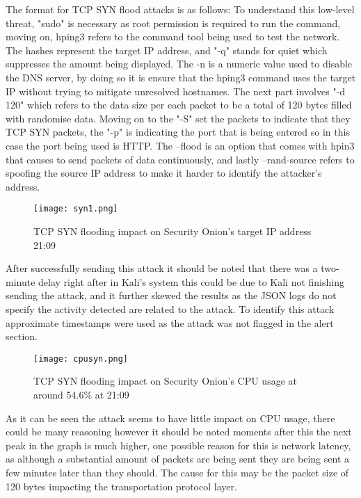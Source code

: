 \documentclass[12pt]{article}
\begin{document}
		The format for TCP SYN flood attacks is as follows:
		To understand this low-level threat, "sudo" is necessary as root permission is required to run the command, moving on, hping3 refers to the command tool being used to test the network. The hashes represent the target IP address, and "-q" stands for quiet which suppresses the amount being displayed. The -n is a numeric value used to disable the DNS server, by doing so it is ensure that the hping3 command uses the target IP without trying to mitigate unresolved hostnames. The next part involves "-d 120" which refers to the data size per each packet to be a total of 120 bytes filled with randomise data. Moving on to the "-S" set the packets to indicate that they 
		TCP SYN packets,  the "-p" is indicating the port that is being entered so in this case the port being used is HTTP. The --flood is an option that comes with hpin3 that causes to send packets of data continuously, and lastly --rand-source refers to spoofing the source IP address to make it harder to identify the attacker's address.
		
		\begin{center}
		\begin{figure}[H]
			\centering
			\texttt{[image: syn1.png]}
			\caption{TCP SYN flooding impact on Security Onion's target IP address 21:09  } 
			\label{fig:syn1}
		\end{figure}
		\end{center}
		After successfully sending this attack it should be noted that there was a two-minute delay right after in Kali's system this could be due to Kali not finishing sending the attack, and it further skewed the results as the JSON logs do not specify the activity detected are related to the attack.
		To identify this attack approximate timestamps were used as the attack was not flagged in the alert section.
		
		
		\begin{center}
		\begin{figure}[H]
			\centering
			\texttt{[image: cpusyn.png]}
			\caption{TCP SYN flooding impact on Security Onion's CPU usage at around 54.6\% at 21:09  } 
			\label{fig:memory2}
		\end{figure}
		\end{center}
		
		As it can be seen the attack seems to have little impact on CPU usage, there could be many reasoning however it should be noted moments after this the next peak in the graph is much higher, one possible reason for this is network latency, as although a substantial amount of packets are being sent they are being sent a few minutes later than they should. The cause for this may be the packet size of 120 bytes impacting the transportation protocol layer.
		
\end{document}
